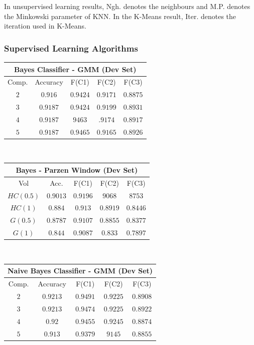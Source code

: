 \documentclass[12pt,journal,compsoc]{IEEEtran}
\begin{document}
\noindent In unsupervised learning results, Ngh. denotes the neighbours and M.P. denotes the Minkowski parameter of KNN. In the K-Means result, Iter. denotes the iteration used in K-Means.
\vspace*{0.2 cm}
\subsubsection{Supervised Learning Algorithms}
\vspace*{0.2 cm}

\begin{center}
\begin{tabular}{|c|c|c|c|c|}
\multicolumn{5}{c}{Bayes Classifier - GMM (Dev Set)}\\
\hline
Comp. & Accuracy & F(C1) & F(C2) & F(C3)\\
\hline
$2$ &$0.916$ &$0.9424$ &$0.9171$ &$0.8875$\\
\hline
$3$ &$0.9187$ &$0.9424$ &$0.9199$ &$0.8931$\\
\hline
$4$ &$0.9187$ &$9463$ &$.9174$ &$0.8917$\\
\hline
$5$ &$0.9187$ &$0.9465$ &$0.9165$ &$0.8926$\\
\hline
\end{tabular}
\\
\vspace*{0.2cm}

\begin{tabular}{|c|c|c|c|c|}
\multicolumn{5}{c}{Bayes - Parzen Window (Dev Set)}\\
\hline
Vol & Acc. & F(C1) & F(C2) & F(C3)\\
\hline
$HC(0.5)$ &$0.9013$ &$0.9196$ &$9068$ &$8753$\\
\hline
$HC(1)$ &$0.884$ &$0.913$ &$0.8919$ &$0.8446$\\
\hline
$G(0.5)$ &$0.8787$ &$0.9107$ &$0.8855$ &$0.8377$\\
\hline
$G(1)$ &$0.844$ &$0.9087$ &$0.833$ &$0.7897$\\
\hline
\end{tabular}
\\
\vspace*{0.2 cm}

\begin{tabular}{|c|c|c|c|c|}
\multicolumn{5}{c}{Naive Bayes Classifier - GMM (Dev Set)}\\
\hline
Comp. & Accuracy & F(C1) & F(C2) & F(C3)\\
\hline
$2$ &$0.9213$ &$0.9491$ &$0.9225$ &$0.8908$\\
\hline
$3$ &$0.9213$ &$0.9474$ &$0.9225$ &$0.8922$\\
\hline
$4$ &$0.92$ &$0.9455$ &$0.9245$ &$0.8874$\\
\hline
$5$ &$0.913$ &$0.9379$ &$9145$ &$0.8855$\\
\hline
\end{tabular}


\end{center}
\end{document}
